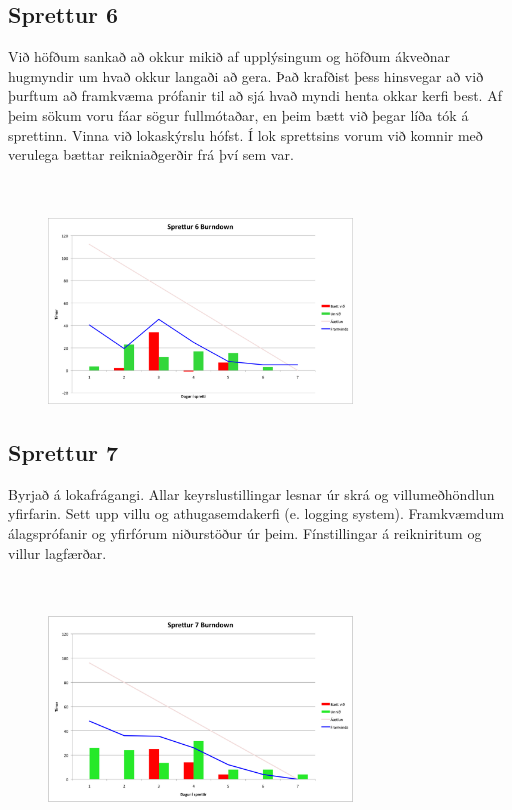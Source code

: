 \documentclass{article}
\begin{document}
\subsection{Sprettur 6}
Við höfðum sankað að okkur mikið af upplýsingum og höfðum ákveðnar hugmyndir um
hvað okkur langaði að gera. Það krafðist þess hinsvegar að við 
þurftum að framkvæma prófanir til að sjá hvað myndi henta okkar kerfi best. 
Af þeim sökum voru fáar sögur fullmótaðar, en þeim bætt við þegar líða tók á sprettinn.
Vinna við lokaskýrslu hófst. Í lok sprettsins vorum við komnir með verulega bættar reikniaðgerðir frá því sem var.
\hfil \\
\hfil \\
\hfil \\
\begin{figure}[H]
 \centering
 \includegraphics[width=0.72\textwidth]{Sprettur6_Burndown.png}
 \caption{}
\label{fig:sp6}
\end{figure}
\newpage
\subsection{Sprettur 7}
Byrjað á lokafrágangi. Allar keyrslustillingar lesnar úr skrá og villumeðhöndlun
yfirfarin. Sett upp villu og athugasemdakerfi (e. logging system). Framkvæmdum álagsprófanir og 
yfirfórum niðurstöður úr þeim. Fínstillingar á reikniritum og villur lagfærðar. 
\hfil \\
\hfil \\
\hfil \\
\begin{figure}[H]
 \centering
 \includegraphics[width=0.72\textwidth]{Sprettur7_Burndown.png}
 \caption{}
\label{fig:sp7}
\end{figure}
\newpage
\end{document}
